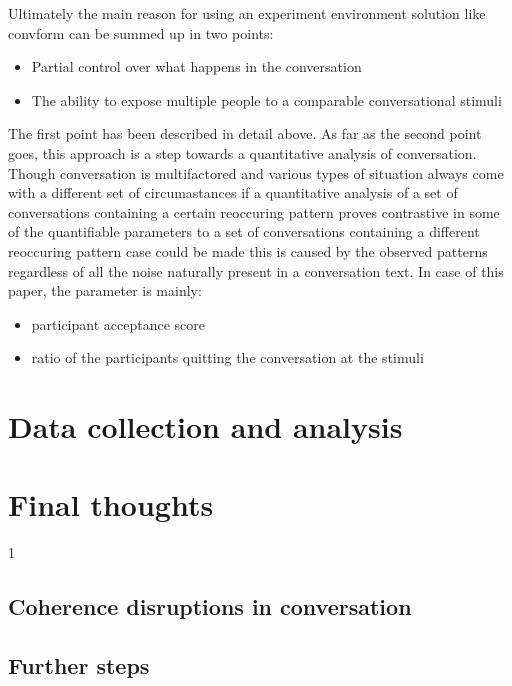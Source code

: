 \documentclass[12pt]{report}
\begin{document}
{Ultimately the main reason for using
an experiment environment solution like convform
can be summed up in two points:

\begin{itemize}
\item{Partial control over what happens in the conversation}
\item{The ability to expose multiple people to a comparable conversational stimuli}
\end{itemize}

The first point has been described in detail above.
As far as the second point goes,
this approach is a step towards
a quantitative analysis of conversation.
Though conversation is multifactored
and various types of situation
always come with a different set of circumastances
if a quantitative analysis of a set of conversations
containing a certain reoccuring pattern
proves contrastive in some of the quantifiable parameters
to a set of conversations containing a different reoccuring pattern
case could be made this is caused by the observed patterns
regardless of all the noise naturally present in a conversation text.
In case of this paper,
the parameter is mainly:

\begin{itemize}
\item{participant acceptance score}
\item{ratio of the participants quitting the conversation at the stimuli}
\end{itemize}








\chapter{Data collection and analysis}



\chapter*{Final thoughts}

1
\section{Coherence disruptions in conversation}

\section{Further steps}

}
\end{document}
